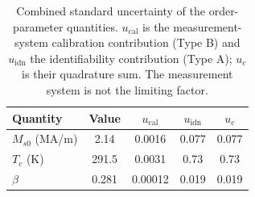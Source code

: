 \begin{table}[htbp]
  \centering
  \caption{Combined standard uncertainty of the order-parameter quantities. $u_{\mathrm{cal}}$ is the measurement-system calibration contribution (Type B) and $u_{\mathrm{idn}}$ the identifiability contribution (Type A); $u_c$ is their quadrature sum. The measurement system is not the limiting factor.}
  \label{tab:uncertainty}
  \begin{tabular}{lcccc}
    \toprule
    Quantity & Value & $u_{\mathrm{cal}}$ & $u_{\mathrm{idn}}$ & $u_c$ \\
    \midrule
    $M_{s0}$ (MA/m) & 2.14 & 0.0016 & 0.077 & 0.077 \\
    $T_c$ (K) & 291.5 & 0.0031 & 0.73 & 0.73 \\
    $\beta$ & 0.281 & 0.00012 & 0.019 & 0.019 \\
    \bottomrule
  \end{tabular}
\end{table}
